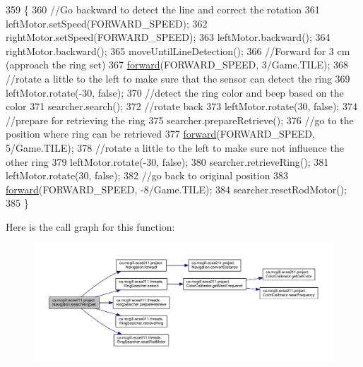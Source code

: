 \begin{DoxyCode}
359                                                    \{
360     \textcolor{comment}{//Go backward to detect the line and correct the rotation}
361     leftMotor.setSpeed(FORWARD\_SPEED);
362     rightMotor.setSpeed(FORWARD\_SPEED);
363     leftMotor.backward();
364     rightMotor.backward();
365     moveUntilLineDetection();
366     \textcolor{comment}{//Forward for 3 cm (approach the ring set)}
367     \hyperlink{classca_1_1mcgill_1_1ecse211_1_1project_1_1_navigation_a7c66610c5b7496ddb35d342ab2cd3f08}{forward}(FORWARD\_SPEED, 3/Game.TILE);
368     \textcolor{comment}{//rotate a little to the left to make sure that the sensor can detect the ring}
369     leftMotor.rotate(-30, \textcolor{keyword}{false});
370     \textcolor{comment}{//detect the ring color and beep based on the color}
371     searcher.search();
372     \textcolor{comment}{//rotate back}
373     leftMotor.rotate(30, \textcolor{keyword}{false});
374     \textcolor{comment}{//prepare for retrieving the ring }
375     searcher.prepareRetrieve();
376     \textcolor{comment}{//go to the position where ring can be retrieved}
377     \hyperlink{classca_1_1mcgill_1_1ecse211_1_1project_1_1_navigation_a7c66610c5b7496ddb35d342ab2cd3f08}{forward}(FORWARD\_SPEED, 5/Game.TILE);
378     \textcolor{comment}{//rotate a little to the left to make sure not influence the other ring}
379     leftMotor.rotate(-30, \textcolor{keyword}{false});
380     searcher.retrieveRing();
381     leftMotor.rotate(30, \textcolor{keyword}{false});
382     \textcolor{comment}{//go back to original position}
383     \hyperlink{classca_1_1mcgill_1_1ecse211_1_1project_1_1_navigation_a7c66610c5b7496ddb35d342ab2cd3f08}{forward}(FORWARD\_SPEED, -8/Game.TILE);
384     searcher.resetRodMotor();
385   \}
\end{DoxyCode}
Here is the call graph for this function\+:
\nopagebreak
\begin{figure}[H]
\begin{center}
\leavevmode
\includegraphics[width=350pt]{classca_1_1mcgill_1_1ecse211_1_1project_1_1_navigation_a720271c3961b2819183210ad6106beff_cgraph}
\end{center}
\end{figure}
